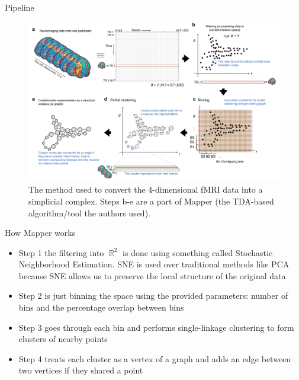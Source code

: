 \documentclass{beamer}
\DeclareMathOperator{\R}{\mathbb{R}}
\begin{document}
\begin{frame}{Pipeline}
    \begin{figure}
        \includegraphics[width = 0.75\linewidth]{fig1.png}
        \caption{The method used to convert the 4-dimensional fMRI data into a simplicial complex. Steps b-e are a part of Mapper (the TDA-based algorithm/tool the authors used).}
    \end{figure}
\end{frame}

\begin{frame}{How Mapper works}
    \begin{itemize}
        \item Step 1 the filtering into $\R^2$ is done using something called Stochastic Neighborhood Estimation. SNE is used over traditional methods like PCA because SNE allows us to preserve the local structure of the original data \pause %
        \item Step 2 is just binning the space using the provided parameters: number of bins and the percentage overlap between bins\pause
        \item Step 3 goes through each bin and performs single-linkage clustering to form clusters of nearby points\pause 
        \item Step 4 treats each cluster as a vertex of a graph and adds an edge between two vertices if they shared a point\cite{mapper}
    \end{itemize}
\end{frame}
\end{document}
